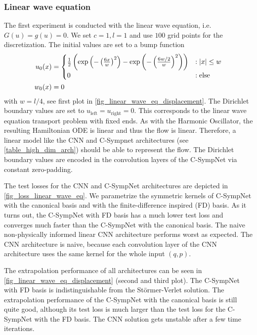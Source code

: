 \documentclass[twoside,a4paper]{article}
\begin{document}
\subsubsection{Linear wave equation}

The first experiment is conducted with the linear wave equation, i.e.
$G(u) = g(u) =0$. We set $c=1, l=1$ and use $100$ grid points for the discretization.
The initial values are set to a bump function
\begin{align*}
	u_0(x) &= \begin{cases}
	\frac{1}{2} \left( 
	\exp \left( - \left( \frac{6x}{w} \right)^2 \right) - \exp \left( - \left( \frac{6w/2}{w} \right)^2 \right) 
	\right) & : \left|{x}\right| \leq w \\
	0 & : \text{else}
	\end{cases} \\
	w_0(x) &= 0
\end{align*}
with $w = l/4$, see first plot in \cref{fig_linear_wave_eq_displacement}.
The Dirichlet boundary values are set to $u_{\text{left}} = u_{\text{right}} = 0$.
This corresponds to the linear wave equation transport problem with fixed ends.
As with the Harmonic Oscillator, the resulting Hamiltonian ODE is linear and thus the
flow is linear. Therefore, a linear model like the CNN
and C-Sympnet architectures (see \cref{table_high_dim_arch}) should be able to represent the flow.
The Dirichlet boundary values are encoded in the convolution layers of the
C-SympNet via constant zero-padding.

The test losses for the CNN and C-SympNet architectures are depicted in
\cref{fig_loss_linear_wave_eq}. We parametrize the symmetric kernels of C-SympNet
with the canonical basis and with the finite-difference inspired (FD) basis. As it turns out,
the C-SympNet with FD basis has a much lower test loss and converges much faster
than the C-SympNet with the canonical basis.
The naive non-physically informed linear CNN architecture performs worst as expected. 
The CNN architecture is naive, because each convolution
layer of the CNN architecture uses the same kernel for the whole input $(q,p)$.

The extrapolation performance of all architectures can be seen in
\cref{fig_linear_wave_eq_displacement} (second and third plot). The C-SympNet with FD basis
is indistinguishable from the Störmer-Verlet solution. The extrapolation performance of the C-SympNet
with the canonical basis is still quite good, although its test loss
is much larger than the test loss for the C-SympNet with the FD basis.
The CNN solution gets unstable after a few time iterations.
\end{document}
